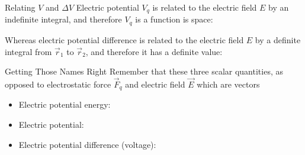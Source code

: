 \documentclass[12pt,aspectratio=169]{beamer}
\begin{document}
\begin{frame}{Relating $V$ and $\Delta V$}
  Electric potential $V_q$ is related to the electric field $E$ by an
  indefinite integral, and therefore $V_q$ is a function is space:


  Whereas electric potential difference is related to the electric field $E$
  by a definite integral from $\vec r_1$ to $\vec r_2$, and therefore it has a
  definite value:
  
\end{frame}



\begin{frame}{Getting Those Names Right}
  Remember that these three scalar quantities, as opposed to electrostatic
  force $\vec F_q$ and electric field $\vec E$ which are vectors
  \begin{itemize}
  \item Electric potential energy:
    
  \item Electric potential:

  \item Electric potential difference (voltage):

  \end{itemize}
\end{frame}



\end{document}
